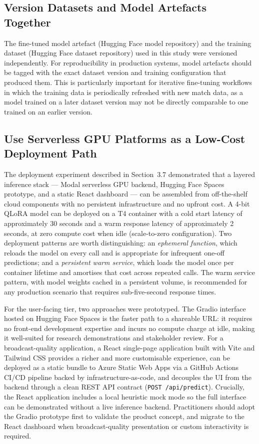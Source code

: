 \subsection{Version Datasets and Model Artefacts Together}

The fine-tuned model artefact (Hugging Face model repository) and the training dataset (Hugging Face dataset repository) used in this study were versioned independently. For reproducibility in production systems, model artefacts should be tagged with the exact dataset version and training configuration that produced them. This is particularly important for iterative fine-tuning workflows in which the training data is periodically refreshed with new match data, as a model trained on a later dataset version may not be directly comparable to one trained on an earlier version.

\subsection{Use Serverless GPU Platforms as a Low-Cost Deployment Path}

The deployment experiment described in Section~3.7 demonstrated that a layered inference stack --- Modal serverless GPU backend, Hugging Face Spaces prototype, and a static React dashboard --- can be assembled from off-the-shelf cloud components with no persistent infrastructure and no upfront cost. A 4-bit QLoRA model can be deployed on a T4 container with a cold start latency of approximately 30 seconds and a warm response latency of approximately 2 seconds, at zero compute cost when idle (scale-to-zero configuration). Two deployment patterns are worth distinguishing: an \textit{ephemeral function}, which reloads the model on every call and is appropriate for infrequent one-off predictions; and a \textit{persistent warm service}, which loads the model once per container lifetime and amortises that cost across repeated calls. The warm service pattern, with model weights cached in a persistent volume, is recommended for any production scenario that requires sub-five-second response times.

For the user-facing tier, two approaches were prototyped. The Gradio \cite{abid2019gradio} interface hosted on Hugging Face Spaces \cite{hfspaces2024} is the faster path to a shareable URL: it requires no front-end development expertise and incurs no compute charge at idle, making it well-suited for research demonstrations and stakeholder review. For a broadcast-quality application, a React single-page application built with Vite and Tailwind CSS provides a richer and more customisable experience, can be deployed as a static bundle to Azure Static Web Apps via a GitHub Actions CI/CD pipeline backed by infrastructure-as-code, and decouples the UI from the backend through a clean REST API contract (\texttt{POST /api/predict}). Crucially, the React application includes a local heuristic mock mode so the full interface can be demonstrated without a live inference backend. Practitioners should adopt the Gradio prototype first to validate the product concept, and migrate to the React dashboard when broadcast-quality presentation or custom interactivity is required.

